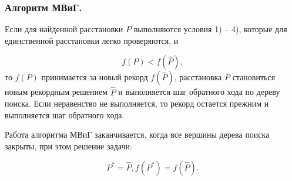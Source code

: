 \begin{frame}
    \fontsize{8pt}{7.2}\selectfont
    \frametitle{Алгоритм МВиГ.}
    \justifying
    Если для найденной расстановки $P$ выполняются условия 1) – 4), которые для единственной расстановки легко проверяются, и

    \begin{displaymath}
        f(P) < f(\widehat{P}),
    \end{displaymath}
    то $f(P)$ принимается за новый рекорд $f(\widehat{P})$, расстановка $P$ становиться новым рекордным решением $\widehat{P}$ и выполняется шаг обратного хода по дереву поиска. Если неравенство не выполняется, то рекорд остается прежним и выполняется шаг обратного хода.

    \bigskip
    Работа алгоритма МВиГ заканчивается, когда все вершины дерева поиска закрыты, при этом решение задачи: 

    \begin{displaymath}
        P^{*} = \widehat{P},  f(P^*) = f(\widehat{P}).
    \end{displaymath}

    \bigskip
    \bigskip
\end{frame}

